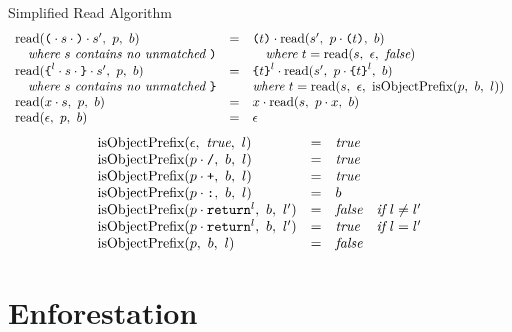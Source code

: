 \documentclass[preprint,10pt]{sigplanconf}
\begin{document}
\begin{displayfigure*}{\label{fig:simpleread}Simplified Read Algorithm}
\[\begin{array}{lcll}
    \textrm{read}(\texttt{(} \cdot s \cdot \texttt{)} \cdot s',~p,~b)
    &=&
    \texttt{(}t\texttt{)} \cdot 
      \textrm{read}(s',~p \cdot \texttt{(}t\texttt{)},~b)
    
    \\
    \quad \textit{where}~s~\textit{contains no unmatched}~\texttt{)} 
    &&\quad \textit{where}~t = \textrm{read}(s,~\epsilon,~\textit{false}) 
    \\
    \textrm{read}(
      \texttt{\{}^l \cdot s \cdot \texttt{\}} \cdot s'
    ,~p,~b)
    &=&
    \texttt{\{}t\texttt{\}}^l \cdot 
      \textrm{read}(s',~
        p \cdot \texttt{\{}t\texttt{\}}^l
      ,~b)
    
    \\
    \quad \textit{where}~s~\textit{contains no unmatched}~\texttt{\}} 
    && \textit{where}~t = \textrm{read}(s,~\epsilon,~\textrm{isObjectPrefix}(p,~b,~l))
    \\
    \textrm{read}(x \cdot s,~p,~b)
    &=&
    x \cdot 
      \textrm{read}(s,~p \cdot x,~b)
   
    \\
    \textrm{read}(\epsilon,~p,~b)
    &=&
    \epsilon \\
  \end{array}
\]
\[
  \begin{array}{lcll}
    \textrm{isObjectPrefix}(\epsilon,~\textit{true},~l) &=& \textit{true}
    \\
    \textrm{isObjectPrefix}(p \cdot \texttt{/},~b,~l) &=& \textit{true}
    \\
    \textrm{isObjectPrefix}(p \cdot \texttt{+},~b,~l) &=& \textit{true}
    \\
    \textrm{isObjectPrefix}(p \cdot \texttt{:},~b,~l) &=& b
    \\
    \textrm{isObjectPrefix}(p \cdot \texttt{return}^{l},~b,~l') &=& \textit{false} 
    & \textit{if}~l \not = l'
    \\
    \textrm{isObjectPrefix}(p \cdot \texttt{return}^{l},~b,~l') &=& \textit{true} 
    & \textit{if}~l = l'
    \\
    \textrm{isObjectPrefix}(p ,~b,~l) &=& \textit{false}
    \\
  \end{array}
\]
\end{displayfigure*}


\section{Enforestation}
\label{sec-4}
\end{document}
